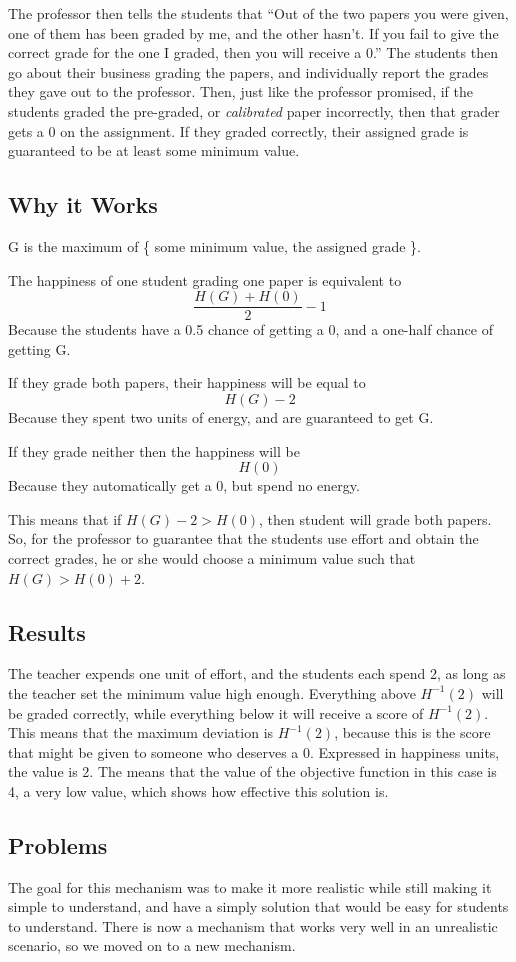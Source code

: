 \documentclass[12pt, Arial]{article}
\begin{document}
The professor then tells the students that ``Out of the two papers you were given, one of them has been graded by me, and the other hasn't. If you fail to give the correct grade for the one I graded, then you will receive a 0.'' The students then go about their business grading the papers, and individually report the grades they gave out to the professor. Then, just like the professor promised, if the students graded the pre-graded, or \emph{calibrated} paper incorrectly, then that grader gets a 0 on the assignment. If they graded correctly, their assigned grade is guaranteed to be at least some minimum value.

\subsection{Why it Works}
G is the maximum of \{ some minimum value, the assigned grade \}.

The happiness of one student grading one paper is equivalent to $$\frac{H(G)+H(0)}{2}-1$$ Because the students have a 0.5 chance of getting a 0, and a one-half chance of getting G.

If they grade both papers, their happiness will be equal to $$H(G)-2$$Because they spent two units of energy, and are guaranteed to get G.

If they grade neither then the happiness will be $$H(0)$$ Because they automatically get a 0, but spend no energy.

This means that if $H(G) - 2 > H(0)$, then student will grade both papers. So, for the professor to guarantee that the students use effort and obtain the correct grades, he or she would choose a minimum value such that $H(G) > H(0) + 2$.
\subsection{Results}
The teacher expends one unit of effort, and the students each spend 2, as long as the teacher set the minimum value high enough.
Everything above $H^{-1}(2)$ will be graded correctly, while everything below it will receive a score of $H^{-1}(2)$.
This means that the maximum deviation is $H^{-1}(2)$, because this is the score that might be given to someone who deserves a 0. Expressed in happiness units, the value is 2.
The means that the value of the objective function in this case is 4, a very low value, which shows how effective this solution is.

\subsection{Problems}
The goal for this mechanism was to make it more realistic while still making it simple to understand, and have a simply solution that would be easy for students to understand. There is now a mechanism that works very well in an unrealistic scenario, so we moved on to a new mechanism. 
\end{document}
